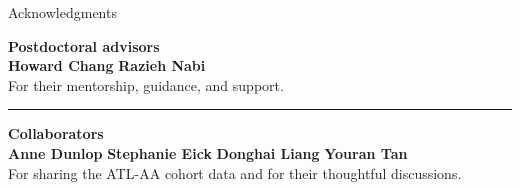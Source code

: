\documentclass[
  ignorenonframetext,
  aspectratio=169,
  11pt]{beamer}
\newcommand{\method}[1]{%
  \textcolor{emoryblue}{\textbf{#1}}%
}
\begin{document}
\begin{frame}{Acknowledgments}
\protect{}\label{acknowledgments}
\centering
\large

\method{Postdoctoral advisors}\\[0.16cm]
\textbf{Howard Chang}
\hspace{0.28cm}\raisebox{-0.08cm}{\color{emorygold}\rule{0.8pt}{0.38cm}}\hspace{0.28cm}
\textbf{Razieh Nabi}\\[0.12cm]
\small For their mentorship, guidance, and support.

\vspace{0.36cm}
{\color{rulegray}\rule{0.72\linewidth}{0.6pt}}
\vspace{0.32cm}

\large
\method{Collaborators}\\[0.16cm]
\textbf{Anne Dunlop}
\hspace{0.18cm}\raisebox{-0.08cm}{\color{emorygold}\rule{0.8pt}{0.38cm}}\hspace{0.18cm}
\textbf{Stephanie Eick}
\hspace{0.18cm}\raisebox{-0.08cm}{\color{emorygold}\rule{0.8pt}{0.38cm}}\hspace{0.18cm}
\textbf{Donghai Liang}
\hspace{0.18cm}\raisebox{-0.08cm}{\color{emorygold}\rule{0.8pt}{0.38cm}}\hspace{0.18cm}
\textbf{Youran Tan}\\[0.14cm]
\small For sharing the ATL-AA cohort data and for their thoughtful discussions.
\end{frame}
\end{document}
